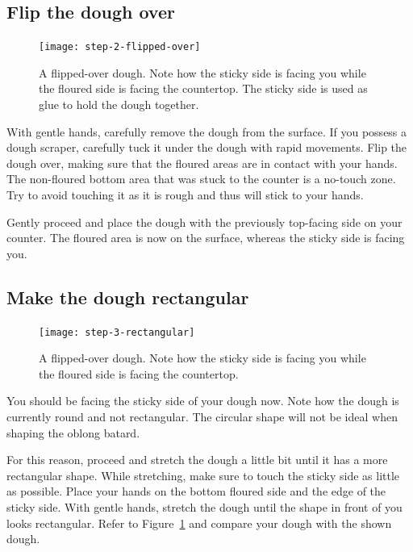 \subsection[Flipping the dough]{Flip the dough over}

\begin{figure}[!htb]
  \centering
  \texttt{[image: step-2-flipped-over]}
  \caption[Step 2 of shaping process]{A flipped-over dough. Note how the
      sticky side is facing you while the floured side is facing the
      countertop.  The sticky side is used as glue to hold the dough together.}
\end{figure}

With gentle hands, carefully remove the dough from the surface. If
you possess a dough scraper, carefully tuck it under the dough with
rapid movements. Flip the dough over, making sure that the floured
areas are in contact with your hands. The non-floured bottom area that was
stuck to the counter is a no-touch zone. Try to avoid touching it
as it is rough and thus will stick to your hands.

Gently proceed and place the dough with the previously top-facing side
on your counter. The floured area is now on the surface, whereas the
sticky side is facing you.

\subsection[Create rectangular shape]{Make the dough rectangular}

\begin{figure}[htb!]
  \centering
  \texttt{[image: step-3-rectangular]}
  \caption[Step 3 of shaping process]{A flipped-over dough. Note how the
      sticky side is facing you while the floured side is facing the
      countertop.}%
  \label{fig:shaping-rectangular-dough}
\end{figure}

You should be facing the sticky side of your dough now. Note how
the dough is currently round and not rectangular. The circular
shape will not be ideal when shaping the oblong batard.

For this reason, proceed and stretch the dough a little bit until
it has a more rectangular shape. While stretching, make sure to touch
the sticky side as little as possible. Place your hands on the bottom
floured side and the edge of the sticky side. With gentle hands,
stretch the dough until the shape in front of you looks rectangular.
Refer to Figure~\ref{fig:shaping-rectangular-dough} and compare
your dough with the shown dough.

